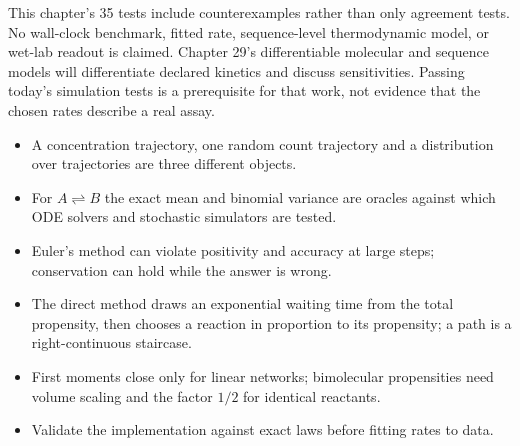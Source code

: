 This chapter's 35 tests include counterexamples rather than only agreement tests.
No wall-clock benchmark, fitted rate, sequence-level thermodynamic model, or wet-lab
readout is claimed. Chapter 29's differentiable molecular and sequence models will
differentiate declared kinetics and discuss sensitivities. Passing today's
simulation tests is a prerequisite for that work, not evidence that the chosen
rates describe a real assay.

\begin{KeyIdeas}
\begin{itemize}\setlength{\itemsep}{2pt}
\item A concentration trajectory, one random count trajectory and a distribution
over trajectories are three different objects.
\item For $A\rightleftharpoons B$ the exact mean and binomial variance are
oracles against which ODE solvers and stochastic simulators are tested.
\item Euler's method can violate positivity and accuracy at large steps;
conservation can hold while the answer is wrong.
\item The direct method draws an exponential waiting time from the total
propensity, then chooses a reaction in proportion to its propensity; a path is a
right-continuous staircase.
\item First moments close only for linear networks; bimolecular propensities need
volume scaling and the factor $1/2$ for identical reactants.
\item Validate the implementation against exact laws before fitting rates to
data.
\end{itemize}
\end{KeyIdeas}

